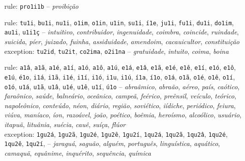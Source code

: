 \begin{rules}
\item\label{rulegrp_proi} rule: \texttt{pro1i1b} -- \emph{proibição}

\item\label{rulegrp_Vi} rule: \texttt{tu1i}, \texttt{bu1i}, \texttt{nu1i}, \texttt{o1im}, \texttt{o1in}, \texttt{u1in}, \texttt{su1i}, \texttt{í1e}, \texttt{ju1i}, \texttt{fu1i}, \texttt{du1i}, \texttt{do1im}, \texttt{au1i}, \texttt{u1i1ç} -- \emph{intuitivo}, \emph{contribuidor}, \emph{ingenuidade}, \emph{coimbra}, \emph{coincide}, \emph{ruindade}, \emph{suicida}, \emph{píer}, \emph{juizado}, \emph{fuinha}, \emph{assiduidade}, \emph{amendoim}, \emph{cacauicultor}, \emph{constituição} \\
exception: \texttt{tu2id}, \texttt{tu2it}, \texttt{co2ima}, \texttt{o2i1na} -- \emph{gratuidade}, \emph{intuito}, \emph{coima}, \emph{boina}

\item\label{rulegrp_aa} rule: \texttt{a1â}, \texttt{a1ã}, \texttt{a1é}, \texttt{a1í}, \texttt{a1ó}, \texttt{a1ô}, \texttt{a1ú}, \texttt{e1á}, \texttt{e1â}, \texttt{e1ã}, \texttt{e1é}, \texttt{e1ê}, \texttt{e1í}, \texttt{e1ó}, \texttt{e1ô}, \texttt{e1ú}, \texttt{é1o}, \texttt{i1á}, \texttt{i1ã}, \texttt{i1é}, \texttt{i1í}, \texttt{i1ó}, \texttt{i1u}, \texttt{i1ú}, \texttt{í1a}, \texttt{í1o}, \texttt{o1á}, \texttt{o1ã}, \texttt{o1é}, \texttt{o1ê}, \texttt{o1í}, \texttt{o1ó}, \texttt{u1á}, \texttt{u1ã}, \texttt{u1â}, \texttt{u1é}, \texttt{u1ê}, \texttt{u1í}, \texttt{ú1o} --  \emph{abraâmico}, \emph{abraão}, \emph{aéreo}, \emph{país}, \emph{caótico}, \emph{faraônico}, \emph{saúde}, \emph{balneário}, \emph{oceânico}, \emph{campeã}, \emph{feérico}, \emph{preênsil}, \emph{veículo}, \emph{teórico}, \emph{napoleônico}, \emph{conteúdo}, \emph{néon}, \emph{diário}, \emph{região}, \emph{soviético}, \emph{iídiche}, \emph{periódico}, \emph{feiura}, \emph{viúva}, \emph{maníaco}, \emph{íon}, \emph{razoável}, \emph{joão}, \emph{poético}, \emph{boêmia}, \emph{heroísmo}, \emph{alcoólico}, \emph{usuário}, \emph{itapuã}, \emph{lituânia}, \emph{suécia}, \emph{cauê}, \emph{suíça}, \emph{flúor} \\
exception: \texttt{1gu2á}, \texttt{1gu2ã}, \texttt{1gu2é}, \texttt{1gu2ê}, \texttt{1gu2í}, \texttt{1qu2á}, \texttt{1qu2ã}, \texttt{1qu2â}, \texttt{1qu2é}, \texttt{1qu2ê}, \texttt{1qu2í}, -- \emph{jaraguá}, \emph{saguão}, \emph{alguém}, \emph{português}, \emph{linguística}, \emph{aquático}, \emph{camaquã}, \emph{equânime}, \emph{inquérito}, \emph{sequência}, \emph{química} 


\end{rules}
